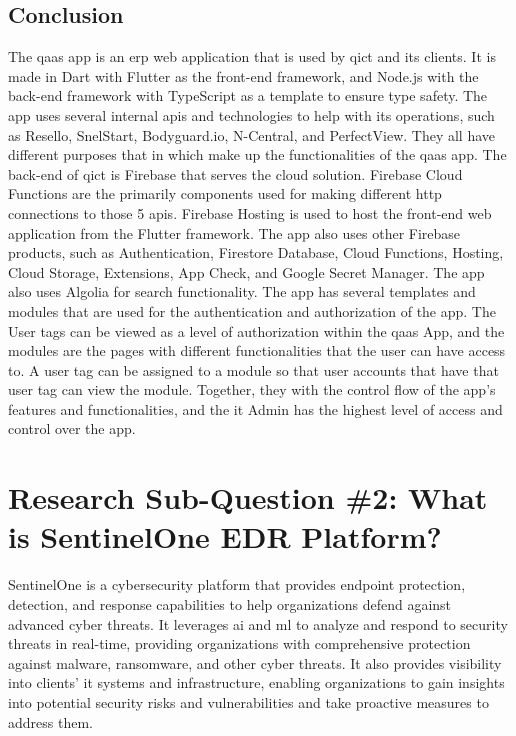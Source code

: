 
\subsection{Conclusion}
The \acrshort{qaas} app is an \acrshort{erp} web application that is used by \acrshort{qict} and its clients.
It is made in Dart with Flutter as the front-end framework, and Node.js with the back-end  framework with
TypeScript as a template to ensure type safety. The app uses several internal \acrshort{api}s and technologies to
help with its operations, such as Resello, SnelStart, Bodyguard.io, N-Central, and PerfectView. They all have different
purposes that in which make up the functionalities of the \acrshort{qaas} app. The back-end of \acrshort{qict} is Firebase that serves the
cloud solution. Firebase Cloud Functions are the primarily components used for making different \acrshort{http} connections to those 5
\acrshort{api}s. Firebase Hosting is used to host the front-end web application from the Flutter framework. The app also
uses other Firebase products, such as Authentication, Firestore Database, Cloud Functions, Hosting, Cloud
Storage, Extensions, App Check, and Google Secret Manager. The app also uses Algolia for search functionality. The app
has several templates and modules that are used for the authentication and authorization of the app.
The User tags can be viewed as a level of authorization within the \acrshort{qaas} App, and the modules are the pages
with different functionalities that the user can have access to. A user tag can be assigned to a module so that user
accounts that have that user tag can view the module. Together, they with the control flow of the app's features and functionalities,
and the \acrshort{it} Admin has the highest level of access and control over the app.

\section{Research Sub-Question \#2: What is SentinelOne EDR Platform?}

SentinelOne is a cybersecurity platform that provides endpoint protection, detection, and response capabilities to
help organizations defend against advanced cyber threats. It leverages \acrshort{ai} and \acrshort{ml} to analyze
and respond to security threats in real-time, providing organizations with comprehensive protection against malware,
ransomware, and other cyber threats. It also provides visibility into clients' \acrshort{it} systems and infrastructure,
enabling organizations to gain insights into potential security risks and vulnerabilities and take proactive measures
to address them.

